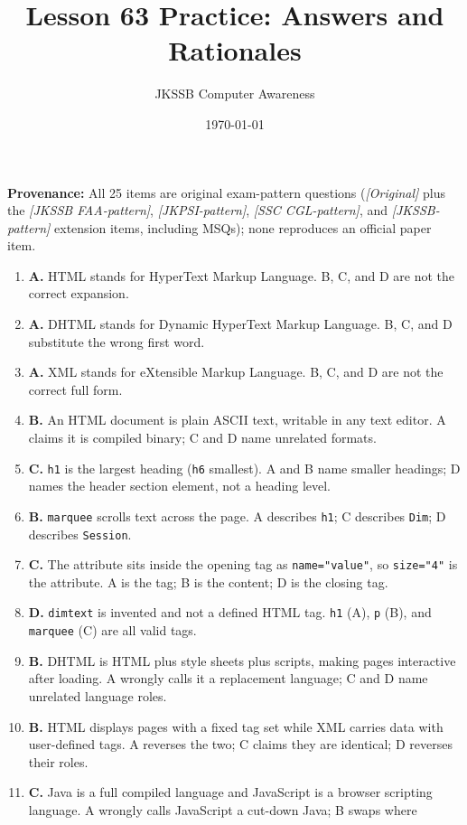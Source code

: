 \documentclass[11pt]{article}
\title{Lesson 63 Practice: Answers and Rationales}
\author{JKSSB Computer Awareness}
\date{\today}
\begin{document}
\maketitle
\noindent\textbf{Provenance:} All 25 items are original exam-pattern questions (\textit{[Original]} plus the \textit{[JKSSB FAA-pattern]}, \textit{[JKPSI-pattern]}, \textit{[SSC CGL-pattern]}, and \textit{[JKSSB-pattern]} extension items, including MSQs); none reproduces an official paper item.
\begin{enumerate}[label=\textbf{Q\arabic*.}, leftmargin=*]
\item \textbf{A.} HTML stands for HyperText Markup Language. B, C, and D are
  not the correct expansion.
\item \textbf{A.} DHTML stands for Dynamic HyperText Markup Language. B, C,
  and D substitute the wrong first word.
\item \textbf{A.} XML stands for eXtensible Markup Language. B, C, and D are
  not the correct full form.
\item \textbf{B.} An HTML document is plain ASCII text, writable in any text
  editor. A claims it is compiled binary; C and D name unrelated formats.
\item \textbf{C.} \texttt{h1} is the largest heading (\texttt{h6} smallest).
  A and B name smaller headings; D names the header section element, not a
  heading level.
\item \textbf{B.} \texttt{marquee} scrolls text across the page. A describes
  \texttt{h1}; C describes \texttt{Dim}; D describes \texttt{Session}.
\item \textbf{C.} The attribute sits inside the opening tag as
  \texttt{name="value"}, so \texttt{size="4"} is the attribute. A is the tag;
  B is the content; D is the closing tag.
\item \textbf{D.} \texttt{dimtext} is invented and not a defined HTML tag.
  \texttt{h1} (A), \texttt{p} (B), and \texttt{marquee} (C) are all valid tags.
\item \textbf{B.} DHTML is HTML plus style sheets plus scripts, making pages
  interactive after loading. A wrongly calls it a replacement language; C and
  D name unrelated language roles.
\item \textbf{B.} HTML displays pages with a fixed tag set while XML carries
  data with user-defined tags. A reverses the two; C claims they are identical;
  D reverses their roles.
\item \textbf{C.} Java is a full compiled language and JavaScript is a browser
  scripting language. A wrongly calls JavaScript a cut-down Java; B swaps where

\end{enumerate}
\end{document}
